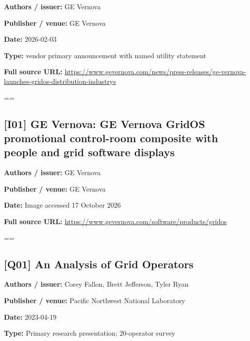\documentclass[10pt,letterpaper]{article}
\begin{document}
\textbf{Authors / issuer:} GE Vernova\par
\textbf{Publisher / venue:} GE Vernova\par
\textbf{Date:} 2026-02-03\par
\textbf{Type:} vendor primary announcement with named utility statement\par
\textbf{Full source URL:} \href{https://www.gevernova.com/news/press-releases/ge-vernova-launches-gridos-distribution-industrys}{\small\ttfamily https:/\allowbreak{}/\allowbreak{}www.\allowbreak{}gevernova.\allowbreak{}com/\allowbreak{}news/\allowbreak{}press-\allowbreak{}releases/\allowbreak{}ge-\allowbreak{}vernova-\allowbreak{}launches-\allowbreak{}gridos-\allowbreak{}distribution-\allowbreak{}industrys}\par
\egroup\par\noindent\box\readingEntry\par\medskip
\setbox\readingEntry=\vbox\bgroup\hsize=\linewidth\subsection*{[I01] GE Vernova: GE Vernova GridOS promotional control-room composite with people and grid software displays}
\textbf{Authors / issuer:} GE Vernova\par
\textbf{Publisher / venue:} GE Vernova\par
\textbf{Date:} Image accessed 17 October 2026\par
\textbf{Full source URL:} \href{https://www.gevernova.com/software/products/gridos}{\small\ttfamily https:/\allowbreak{}/\allowbreak{}www.\allowbreak{}gevernova.\allowbreak{}com/\allowbreak{}software/\allowbreak{}products/\allowbreak{}gridos}\par
\egroup\par\noindent\box\readingEntry\par\medskip
\setbox\readingEntry=\vbox\bgroup\hsize=\linewidth\subsection*{[Q01] An Analysis of Grid Operators}
\textbf{Authors / issuer:} Corey Fallon, Brett Jefferson, Tyler Ryan\par
\textbf{Publisher / venue:} Pacific Northwest National Laboratory\par
\textbf{Date:} 2023-04-19\par
\textbf{Type:} Primary research presentation; 20-operator survey\par
\end{document}
